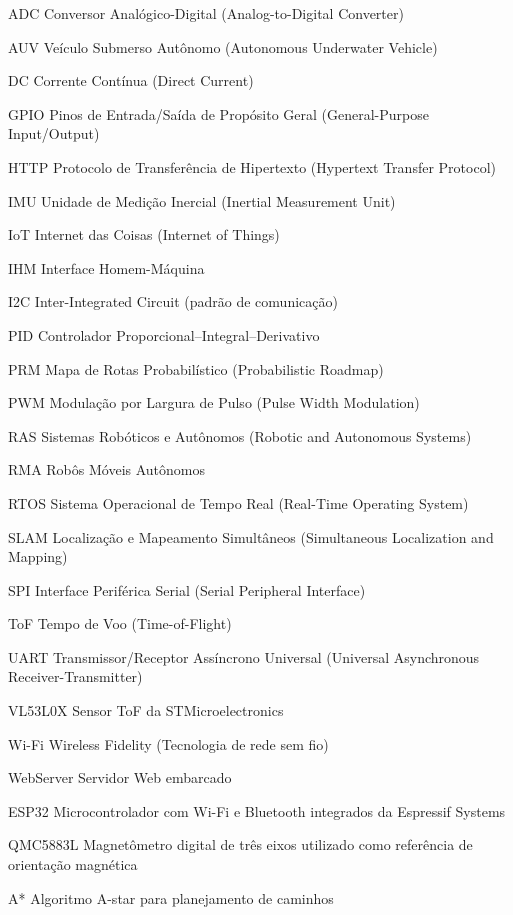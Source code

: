 \documentclass[	12pt, Times, openright, twoside, a4paper, english, brazil]{abntex2}
\begin{document}
\begin{siglas}
	\item[ADC] Conversor Analógico-Digital (Analog-to-Digital Converter)
	\item[AUV] Veículo Submerso Autônomo (Autonomous Underwater Vehicle)
	\item[DC] Corrente Contínua (Direct Current)
	\item[GPIO] Pinos de Entrada/Saída de Propósito Geral (General-Purpose Input/Output)
	\item[HTTP] Protocolo de Transferência de Hipertexto (Hypertext Transfer Protocol)
	\item[IMU] Unidade de Medição Inercial (Inertial Measurement Unit)
	\item[IoT] Internet das Coisas (Internet of Things)
	\item[IHM] Interface Homem-Máquina
	\item[I2C] Inter-Integrated Circuit (padrão de comunicação)
	\item[PID] Controlador Proporcional–Integral–Derivativo
	\item[PRM] Mapa de Rotas Probabilístico (Probabilistic Roadmap)
	\item[PWM] Modulação por Largura de Pulso (Pulse Width Modulation)
	\item[RAS] Sistemas Robóticos e Autônomos (Robotic and Autonomous Systems)
	\item[RMA] Robôs Móveis Autônomos
	\item[RTOS] Sistema Operacional de Tempo Real (Real-Time Operating System)
	\item[SLAM] Localização e Mapeamento Simultâneos (Simultaneous Localization and Mapping)
	\item[SPI] Interface Periférica Serial (Serial Peripheral Interface)
	\item[ToF] Tempo de Voo (Time-of-Flight)
	\item[UART] Transmissor/Receptor Assíncrono Universal (Universal Asynchronous Receiver-Transmitter)
	\item[VL53L0X] Sensor ToF da STMicroelectronics
	\item[Wi-Fi] Wireless Fidelity (Tecnologia de rede sem fio)
	\item[WebServer] Servidor Web embarcado
	\item[ESP32] Microcontrolador com Wi-Fi e Bluetooth integrados da Espressif Systems
	\item[QMC5883L] Magnetômetro digital de três eixos utilizado como referência de orientação magnética
	\item[A*] Algoritmo A-star para planejamento de caminhos
\end{siglas}
\end{document}
